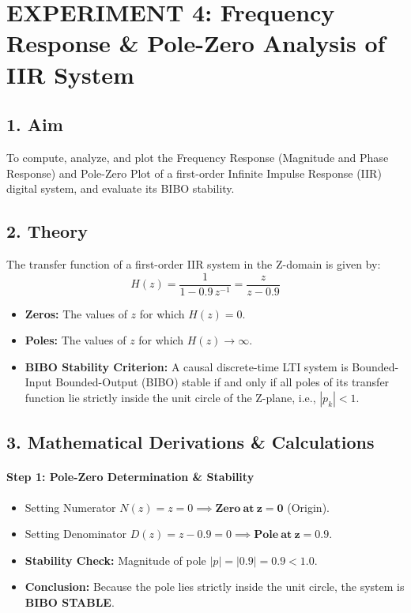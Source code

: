 \documentclass[11pt,a4paper]{article}
\begin{document}
\section*{\textcolor{headcolor}{EXPERIMENT 4: Frequency Response \& Pole-Zero Analysis of IIR System}}

\subsection*{1. Aim}
To compute, analyze, and plot the Frequency Response (Magnitude and Phase Response) and Pole-Zero Plot of a first-order Infinite Impulse Response (IIR) digital system, and evaluate its BIBO stability.

\subsection*{2. Theory}
The transfer function of a first-order IIR system in the Z-domain is given by:
\begin{equation}
    H(z) = \frac{1}{1 - 0.9\,z^{-1}} = \frac{z}{z - 0.9}
\end{equation}
\begin{itemize}
    \item \textbf{Zeros:} The values of $z$ for which $H(z) = 0$.
    \item \textbf{Poles:} The values of $z$ for which $H(z) \to \infty$.
    \item \textbf{BIBO Stability Criterion:} A causal discrete-time LTI system is Bounded-Input Bounded-Output (BIBO) stable if and only if all poles of its transfer function lie strictly inside the unit circle of the Z-plane, i.e., $|p_k| < 1$.
\end{itemize}

\subsection*{3. Mathematical Derivations \& Calculations}

\paragraph{Step 1: Pole-Zero Determination \& Stability}
\begin{itemize}
    \item Setting Numerator $N(z) = z = 0 \implies \mathbf{Zero\ at\ z = 0}$ (Origin).
    \item Setting Denominator $D(z) = z - 0.9 = 0 \implies \mathbf{Pole\ at\ z = 0.9}$.
    \item \textbf{Stability Check:} Magnitude of pole $|p| = |0.9| = 0.9 < 1.0$.
    \item \textbf{Conclusion:} Because the pole lies strictly inside the unit circle, the system is \textbf{BIBO STABLE}.
\end{itemize}
\end{document}
